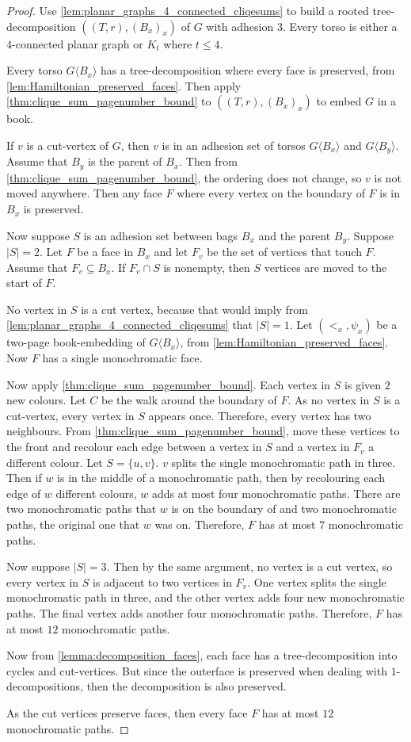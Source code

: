 \begin{proof}
	Use \cref{lem:planar_graphs_4_connected_cliqesums} to build a rooted tree-decomposition $((T,r), (B_x)_x)$ of $G$ with adhesion $3$. Every torso is either a $4$-connected planar graph or $K_t$ where $t \leq 4$.
	
	Every torso $G \langle B_x \rangle$ has a tree-decomposition where every face is preserved, from \cref{lem:Hamiltonian_preserved_faces}. Then apply \cref{thm:clique_sum_pagenumber_bound} to $((T,r), (B_x)_x)$ to embed $G$ in a book.

	If $v$ is a cut-vertex of $G$, then $v$ is in an adhesion set of torsos $G \langle B_x \rangle$ and $G \langle B_y \rangle$. Assume that $B_y$ is the parent of $B_x$. Then from \cref{thm:clique_sum_pagenumber_bound}, the ordering does not change, so $v$ is not moved anywhere. Then any face $F$ where every vertex on the boundary of $F$ is in $B_x$ is preserved. 

	Now suppose $S$ is an adhesion set between bags $B_x$ and the parent $B_y$. Suppose $ |S| = 2$. Let $F$ be a face in $B_x$ and let $F_v$ be the set of vertices that touch $F$. Assume that $F_v \subseteq B_x$. If $F_v \cap S$ is nonempty, then $S$ vertices are moved to the start of $F$. 
	
	No vertex in $S$ is a cut vertex, because that would imply from \cref{lem:planar_graphs_4_connected_cliqesums} that $|S| = 1$. Let $(<_x, \psi_x)$ be a two-page book-embedding of $G \langle B_x \rangle$, from \cref{lem:Hamiltonian_preserved_faces}. Now $F$ has a single monochromatic face.
	
	Now apply \cref{thm:clique_sum_pagenumber_bound}. Each vertex in $S$ is given $2$ new colours. Let $C$ be the walk around the boundary of $F$. As no vertex in $S$ is a cut-vertex, every vertex in $S$ appears once. Therefore, every vertex has two neighbours. From \cref{thm:clique_sum_pagenumber_bound}, move these vertices to the front and recolour each edge between a vertex in $S$ and a vertex in $F_v$ a different colour. Let $S = \{u,v\}$. $v$ splits the single monochromatic path in three. Then if $w$ is in the middle of a monochromatic path, then by recolouring each edge of $w$ different colours, $w$ adds at most four monochromatic paths. There are two monochromatic paths that $w$ is on the boundary of and two monochromatic paths, the original one that $w$ was on. Therefore, $F$ has at most $7$ monochromatic paths.

	Now suppose $|S| = 3$. Then by the same argument, no vertex is a cut vertex, so every vertex in $S$ is adjacent to two vertices in $F_v$. One vertex splits the single monochromatic path in three, and the other vertex adds four new monochromatic paths. The final vertex adds another four monochromatic paths. Therefore, $F$ has at most $12$ monochromatic paths.

	Now from \cref{lemma:decomposition_faces}, each face has a tree-decomposition into cycles and cut-vertices. But since the outerface is preserved when dealing with $1$-decompositions, then the decomposition is also preserved. 
	
	As the cut vertices preserve faces, then every face $F$ has at most $12$ monochromatic paths.
\end{proof}	